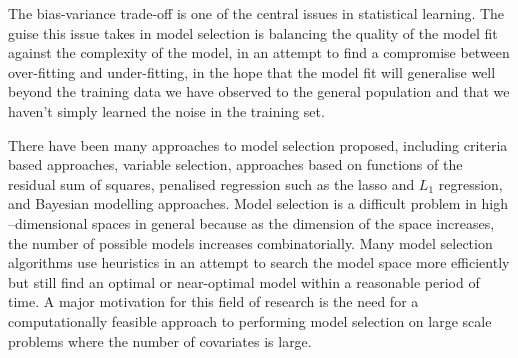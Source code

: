 \documentclass{amsart}[12pt]
\begin{document}
The bias-variance trade-off is one of the central issues in statistical learning. The guise this issue takes
in model selection is balancing the quality of the model fit against the complexity of the model, in an
attempt to find a compromise between over-fitting and under-fitting, in the hope that the model fit will
generalise well beyond the training data we have observed to the general population and that we haven't simply
learned the noise in the training set.

There have been many approaches to model selection proposed, including criteria based approaches, variable
selection, approaches based on functions of the residual sum of squares, penalised regression such as the
lasso and $L_1$ regression, and Bayesian modelling approaches. Model selection is a difficult problem in high
--dimensional spaces in general because as the dimension of the space increases, the number of possible models
increases combinatorially. Many model selection algorithms use heuristics in an attempt to search the model
space more efficiently but still find an optimal or near-optimal model within a reasonable period of time. A
major motivation for this field of research is the need for a computationally feasible approach to performing
model selection on large scale problems where the number of covariates is large.
\end{document}
